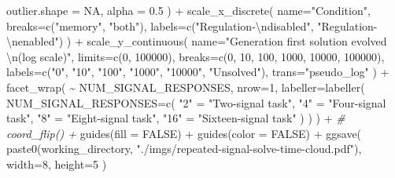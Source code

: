 \documentclass[
]{book}
\newenvironment{Shaded}{\begin{snugshade}}{\end{snugshade}}
\newcommand{\AttributeTok}[1]{\textcolor[rgb]{0.77,0.63,0.00}{#1}}
\newcommand{\CommentTok}[1]{\textcolor[rgb]{0.56,0.35,0.01}{\textit{#1}}}
\newcommand{\ConstantTok}[1]{\textcolor[rgb]{0.00,0.00,0.00}{#1}}
\newcommand{\DecValTok}[1]{\textcolor[rgb]{0.00,0.00,0.81}{#1}}
\newcommand{\FloatTok}[1]{\textcolor[rgb]{0.00,0.00,0.81}{#1}}
\newcommand{\FunctionTok}[1]{\textcolor[rgb]{0.00,0.00,0.00}{#1}}
\newcommand{\NormalTok}[1]{#1}
\newcommand{\OtherTok}[1]{\textcolor[rgb]{0.56,0.35,0.01}{#1}}
\newcommand{\SpecialCharTok}[1]{\textcolor[rgb]{0.00,0.00,0.00}{#1}}
\newcommand{\StringTok}[1]{\textcolor[rgb]{0.31,0.60,0.02}{#1}}
\begin{document}
\begin{Shaded}
\begin{Highlighting}[]
    \AttributeTok{outlier.shape =} \ConstantTok{NA}\NormalTok{,}
    \AttributeTok{alpha =} \FloatTok{0.5}
\NormalTok{  ) }\SpecialCharTok{+}
  \FunctionTok{scale\_x\_discrete}\NormalTok{(}
    \AttributeTok{name=}\StringTok{"Condition"}\NormalTok{,}
    \AttributeTok{breaks=}\FunctionTok{c}\NormalTok{(}\StringTok{"memory"}\NormalTok{, }\StringTok{"both"}\NormalTok{),}
    \AttributeTok{labels=}\FunctionTok{c}\NormalTok{(}\StringTok{"Regulation{-}}\SpecialCharTok{\textbackslash{}n}\StringTok{disabled"}\NormalTok{, }\StringTok{"Regulation{-}}\SpecialCharTok{\textbackslash{}n}\StringTok{enabled"}\NormalTok{)}
\NormalTok{  ) }\SpecialCharTok{+}
  \FunctionTok{scale\_y\_continuous}\NormalTok{(}
    \AttributeTok{name=}\StringTok{"Generation first solution evolved }\SpecialCharTok{\textbackslash{}n}\StringTok{(log scale)"}\NormalTok{,}
    \AttributeTok{limits=}\FunctionTok{c}\NormalTok{(}\DecValTok{0}\NormalTok{, }\DecValTok{100000}\NormalTok{),}
    \AttributeTok{breaks=}\FunctionTok{c}\NormalTok{(}\DecValTok{0}\NormalTok{, }\DecValTok{10}\NormalTok{, }\DecValTok{100}\NormalTok{, }\DecValTok{1000}\NormalTok{, }\DecValTok{10000}\NormalTok{, }\DecValTok{100000}\NormalTok{),}
    \AttributeTok{labels=}\FunctionTok{c}\NormalTok{(}\StringTok{"0"}\NormalTok{, }\StringTok{"10"}\NormalTok{, }\StringTok{"100"}\NormalTok{, }\StringTok{"1000"}\NormalTok{, }\StringTok{"10000"}\NormalTok{, }\StringTok{"Unsolved"}\NormalTok{),}
    \AttributeTok{trans=}\StringTok{"pseudo\_log"}
\NormalTok{  ) }\SpecialCharTok{+}
  \FunctionTok{facet\_wrap}\NormalTok{(}
    \SpecialCharTok{\textasciitilde{}}\NormalTok{ NUM\_SIGNAL\_RESPONSES,}
    \AttributeTok{nrow=}\DecValTok{1}\NormalTok{,}
    \AttributeTok{labeller=}\FunctionTok{labeller}\NormalTok{(}
      \AttributeTok{NUM\_SIGNAL\_RESPONSES=}\FunctionTok{c}\NormalTok{(}
        \StringTok{"2"} \OtherTok{=} \StringTok{"Two{-}signal task"}\NormalTok{,}
        \StringTok{"4"} \OtherTok{=} \StringTok{"Four{-}signal task"}\NormalTok{,}
        \StringTok{"8"} \OtherTok{=} \StringTok{"Eight{-}signal task"}\NormalTok{,}
        \StringTok{"16"} \OtherTok{=} \StringTok{"Sixteen{-}signal task"}
\NormalTok{      )}
\NormalTok{    )}
\NormalTok{  ) }\SpecialCharTok{+}
  \CommentTok{\# coord\_flip() +}
  \FunctionTok{guides}\NormalTok{(}\AttributeTok{fill =} \ConstantTok{FALSE}\NormalTok{) }\SpecialCharTok{+}
  \FunctionTok{guides}\NormalTok{(}\AttributeTok{color =} \ConstantTok{FALSE}\NormalTok{) }\SpecialCharTok{+}
  \FunctionTok{ggsave}\NormalTok{(}
    \FunctionTok{paste0}\NormalTok{(working\_directory, }\StringTok{"./imgs/repeated{-}signal{-}solve{-}time{-}cloud.pdf"}\NormalTok{),}
    \AttributeTok{width=}\DecValTok{8}\NormalTok{,}
    \AttributeTok{height=}\DecValTok{5}
\NormalTok{  )}
\end{Highlighting}
\end{Shaded}
\end{document}
